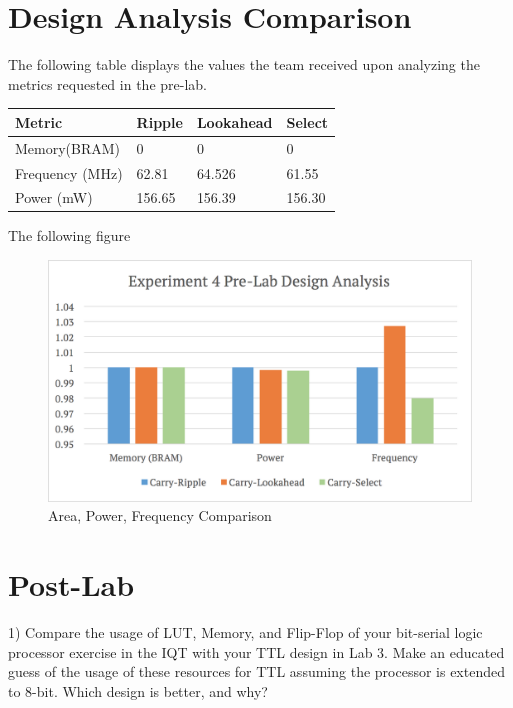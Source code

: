 \documentclass[journal, twocolumn, final,11pt,letterpaper]{IEEEtran}
\begin{document}
\section{Design Analysis Comparison}
The following table displays the values the team received upon analyzing the metrics requested in the pre-lab.
\begin{center}
	\begin{tabular}{l|lll}
		Metric & Ripple & Lookahead & Select \\ \hline
		Memory(BRAM) & 0 & 0 & 0 \\
		Frequency (MHz) & 62.81 & 64.526 & 61.55\\
		Power (mW) & 156.65 & 156.39 & 156.30\\
	\end{tabular}
\end{center}

The following figure 

\begin{figure} [H]
	\centering
	\includegraphics[scale=0.35]{pre-lab-design-analysis.png}
	\caption{Area, Power, Frequency Comparison\label{fig:pre-lab-design-analysis}}
\end{figure}


\section{Post-Lab}
1) Compare the usage of LUT, Memory, and Flip-Flop of your bit-serial logic processor
exercise in the IQT with your TTL design in Lab 3. Make an educated guess of the usage of
these resources for TTL assuming the processor is extended to 8-bit. Which design is better, and
why? \\
\end{document}
